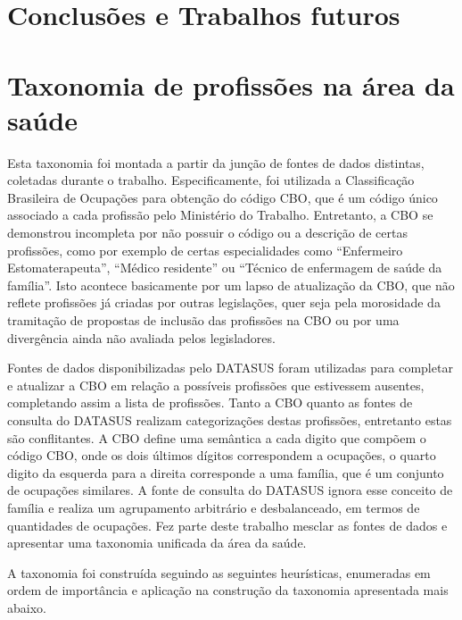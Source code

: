 \documentclass[a4paper,11pt]{article}
\begin{document}
\newpage
\section{Conclusões e Trabalhos futuros}




\appendix
\section{Taxonomia de profissões na área da saúde}
\label{app:taxonomiaProfissões}

Esta taxonomia foi montada a partir da junção de fontes de dados distintas, coletadas durante o trabalho.
Especificamente, foi utilizada a Classificação Brasileira de Ocupações para obtenção do código CBO, que é um código único associado a cada profissão pelo Ministério do Trabalho.
Entretanto, a CBO se demonstrou incompleta por não possuir o código ou a descrição de certas profissões, como por exemplo de certas especialidades como ``Enfermeiro Estomaterapeuta'', ``Médico residente'' ou ``Técnico de enfermagem de saúde da família''.
Isto acontece basicamente por um lapso de atualização da CBO, que não reflete profissões já criadas por outras legislações, quer seja pela morosidade da tramitação de propostas de inclusão das profissões na CBO ou por uma divergência ainda não avaliada pelos legisladores.

Fontes de dados disponibilizadas pelo DATASUS foram utilizadas para completar e atualizar a CBO em relação a possíveis profissões que estivessem ausentes, completando assim a lista de profissões.
Tanto a CBO quanto as fontes de consulta do DATASUS realizam categorizações destas profissões, entretanto estas são conflitantes.
A CBO define uma semântica a cada digito que compõem o código CBO, onde os dois últimos dígitos correspondem a ocupações, o quarto digito da esquerda para a direita corresponde a uma família, que é um conjunto de ocupações similares.
A fonte de consulta do DATASUS ignora esse conceito de família e realiza um agrupamento arbitrário e desbalanceado, em termos de quantidades de ocupações.
Fez parte deste trabalho mesclar as fontes de dados e apresentar uma taxonomia unificada da área da saúde.

A taxonomia foi construída seguindo as seguintes heurísticas, enumeradas em ordem de importância e aplicação na construção da taxonomia apresentada mais abaixo.
\end{document}

